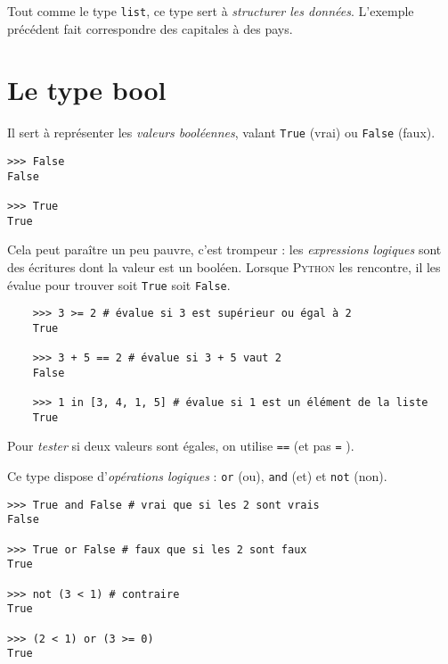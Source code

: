 Tout comme le type \texttt{list}, ce type sert à \textit{structurer les données}. L'exemple précédent fait correspondre des capitales à des pays.



\section{Le type bool}
Il sert à représenter les \textit{valeurs booléennes}, valant \texttt{True} (vrai) ou
\texttt{False} (faux).

\begin{pys}\begin{verbatim}
>>> False
False

>>> True
True
\end{verbatim}
\end{pys}

Cela peut paraître un peu pauvre, c'est trompeur : les \textit{expressions logiques} sont des écritures dont la valeur est un booléen. Lorsque \textsc{Python} les rencontre, il les évalue pour trouver soit \texttt{True} soit \texttt{False}.

\begin{pyc}
  \begin{verbatim}
    >>> 3 >= 2 # évalue si 3 est supérieur ou égal à 2
    True
    
    >>> 3 + 5 == 2 # évalue si 3 + 5 vaut 2
    False

    >>> 1 in [3, 4, 1, 5] # évalue si 1 est un élément de la liste
    True
  \end{verbatim}
\end{pyc}

\begin{remarque}[]
  Pour \textit{tester} si deux valeurs sont égales, on utilise \texttt{==}  (et pas \texttt{=} ).
\end{remarque}

Ce type dispose d'\textit{opérations logiques} : \texttt{or} (ou), \texttt{and} (et) et \texttt{not} (non).

\begin{pyc}\begin{verbatim}
>>> True and False # vrai que si les 2 sont vrais
False

>>> True or False # faux que si les 2 sont faux
True

>>> not (3 < 1) # contraire
True

>>> (2 < 1) or (3 >= 0)
True
\end{verbatim}
\end{pyc}